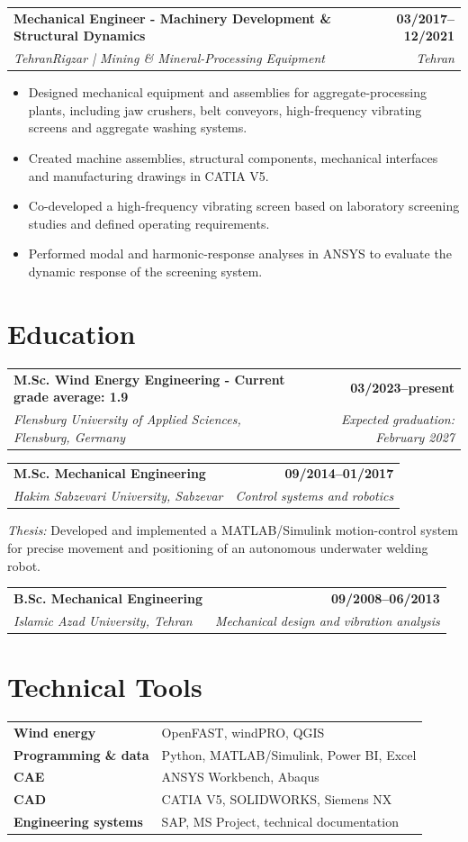 \documentclass[10pt,a4paper]{article}
\makeatletter
\newcommand{\cvjob}[4]{%
  \begin{tabularx}{\linewidth}{@{}Xr@{}}
    \textbf{#1} & \textbf{#2}\\[1pt]
    \textit{#3} & \textit{#4}
  \end{tabularx}
  \vspace{0.05em}
}
\newcommand{\cvedu}[4]{%
  \begin{tabularx}{\linewidth}{@{}Xr@{}}
    \textbf{#1} & \textbf{#2}\\[1pt]
    \textit{#3} & \textit{#4}
  \end{tabularx}
  \vspace{0.03em}
}
\makeatother
\begin{document}
\cvjob{Mechanical Engineer - Machinery Development \& Structural Dynamics}{03/2017--12/2021}{TehranRigzar | Mining \& Mineral-Processing Equipment}{Tehran}
\begin{itemize}
  \item Designed mechanical equipment and assemblies for aggregate-processing plants, including jaw crushers, belt conveyors, high-frequency vibrating screens and aggregate washing systems.

  \item Created machine assemblies, structural components, mechanical interfaces and manufacturing drawings in CATIA V5.

  \item Co-developed a high-frequency vibrating screen based on laboratory screening studies and defined operating requirements.

  \item Performed modal and harmonic-response analyses in ANSYS to evaluate the dynamic response of the screening system.

\end{itemize}


\section{Education}

\cvedu
  {M.Sc. Wind Energy Engineering - Current grade average: 1.9}
  {03/2023--present}
  {Flensburg University of Applied Sciences, Flensburg, Germany}
  {Expected graduation: February 2027}

\vspace{1.2mm}

\cvedu
  {M.Sc. Mechanical Engineering}
  {09/2014--01/2017}
  {Hakim Sabzevari University, Sabzevar}
  {Control systems and robotics}

\vspace{0.6mm}

\textit{Thesis:} Developed and implemented a MATLAB/Simulink motion-control system for precise movement and positioning of an autonomous underwater welding robot.

\vspace{1.2mm}

\cvedu
  {B.Sc. Mechanical Engineering}
  {09/2008--06/2013}
  {Islamic Azad University, Tehran}
  {Mechanical design and vibration analysis}
\section{Technical Tools}
\begin{tabularx}{\linewidth}{@{}>{\raggedright\arraybackslash}p{4cm}X@{}}
\textbf{Wind energy} & OpenFAST, windPRO, QGIS\\
\textbf{Programming \& data} & Python, MATLAB/Simulink, Power BI, Excel\\
\textbf{CAE} & ANSYS Workbench, Abaqus\\
\textbf{CAD} & CATIA V5, SOLIDWORKS, Siemens NX\\
\textbf{Engineering systems} & SAP, MS Project, technical documentation
\end{tabularx}
\end{document}
